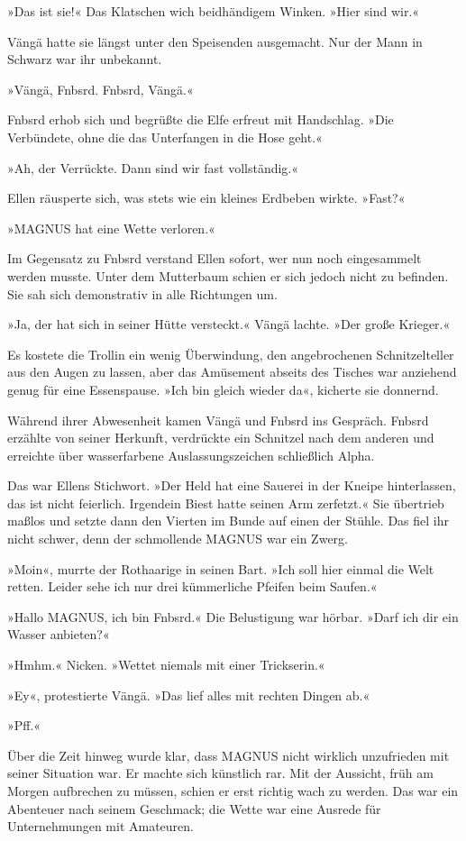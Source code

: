 »Das ist sie!« Das Klatschen wich beidhändigem Winken. »Hier sind wir.«

Vängä hatte sie längst unter den Speisenden ausgemacht. Nur der Mann in Schwarz war ihr unbekannt.

»Vängä, Fnbsrd. Fnbsrd, Vängä.«

Fnbsrd erhob sich und begrüßte die Elfe erfreut mit Handschlag. »Die Verbündete, ohne die das Unterfangen in die Hose geht.«

»Ah, der Verrückte. Dann sind wir fast vollständig.«

Ellen räusperte sich, was stets wie ein kleines Erdbeben wirkte. »Fast?«

»MAGNUS hat eine Wette verloren.«

Im Gegensatz zu Fnbsrd verstand Ellen sofort, wer nun noch eingesammelt werden musste. Unter dem Mutterbaum schien er sich jedoch nicht zu befinden. Sie sah sich demonstrativ in alle Richtungen um.

»Ja, der hat sich in seiner Hütte versteckt.« Vängä lachte. »Der große Krieger.«

Es kostete die Trollin ein wenig Überwindung, den angebrochenen Schnitzelteller aus den Augen zu lassen, aber das Amüsement abseits des Tisches war anziehend genug für eine Essenspause. »Ich bin gleich wieder da«, kicherte sie donnernd.

Während ihrer Abwesenheit kamen Vängä und Fnbsrd ins Gespräch. Fnbsrd erzählte von seiner Herkunft, verdrückte ein Schnitzel nach dem anderen und erreichte über wasserfarbene Auslassungszeichen schließlich Alpha.

Das war Ellens Stichwort. »Der Held hat eine Sauerei in der Kneipe hinterlassen, das ist nicht feierlich. Irgendein Biest hatte seinen Arm zerfetzt.« Sie übertrieb maßlos und setzte dann den Vierten im Bunde auf einen der Stühle. Das fiel ihr nicht schwer, denn der schmollende MAGNUS war ein Zwerg.

»Moin«, murrte der Rothaarige in seinen Bart. »Ich soll hier einmal die Welt retten. Leider sehe ich nur drei kümmerliche Pfeifen beim Saufen.«

»Hallo MAGNUS, ich bin Fnbsrd.« Die Belustigung war hörbar. »Darf ich dir ein Wasser anbieten?«

»Hmhm.« Nicken. »Wettet niemals mit einer Trickserin.«

»Ey«, protestierte Vängä. »Das lief alles mit rechten Dingen ab.«

»Pff.«

Über die Zeit hinweg wurde klar, dass MAGNUS nicht wirklich unzufrieden mit seiner Situation war. Er machte sich künstlich rar. Mit der Aussicht, früh am Morgen aufbrechen zu müssen, schien er erst richtig wach zu werden. Das war ein Abenteuer nach seinem Geschmack; die Wette war eine Ausrede für Unternehmungen mit Amateuren.

